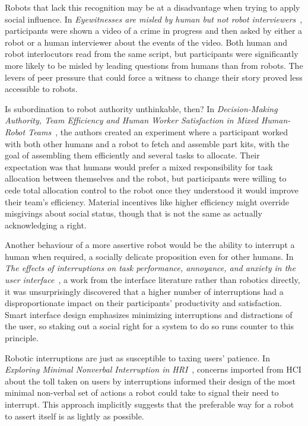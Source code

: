 \documentclass{sfuthesis}
\begin{document}
Robots that lack this recognition may be at a disadvantage when trying to apply social influence. In \textit{Eyewitnesses are misled by human but not robot interviewers}~\cite{bethel2013eyewitnesses}, participants were shown a video of a crime in progress and then asked by either a robot or a human interviewer about the events of the video. Both human and robot interlocutors read from the same script, but participants were significantly more likely to be misled by leading questions from humans than from robots. The levers of peer pressure that could force a witness to change their story proved less accessible to robots. 

Is subordination to robot authority unthinkable, then? In \textit{Decision-Making Authority, Team Efficiency and Human Worker Satisfaction in Mixed Human-Robot Teams}~\cite{gombolay2015decision}, the authors created an experiment where a participant worked with both other humans and a robot to fetch and assemble part kits, with the goal of assembling them efficiently and several tasks to allocate. Their expectation was that humans would prefer a mixed responsibility for task allocation between themselves and the robot, but participants were willing to cede total allocation control to the robot once they understood it would improve their team's efficiency. Material incentives like higher efficiency might override misgivings about social status, though that is not the same as actually acknowledging a right.


Another behaviour of a more assertive robot would be the ability to interrupt a human when required, a socially delicate proposition even for other humans. In \textit{The effects of interruptions on task performance, annoyance, and anxiety in the user interface}~\cite{bailey2001effects}, a work from the interface literature rather than robotics directly, it was unsurprisingly discovered that a higher number of interruptions had a disproportionate impact on their participants' productivity and satisfaction. Smart interface design emphasizes minimizing interruptions and distractions of the user, so staking out a social right for a system to do so runs counter to this principle.

Robotic interruptions are just as susceptible to taxing users' patience. In \textit{Exploring Minimal Nonverbal Interruption in HRI}~\cite{saulnier2011exploring}, concerns imported from HCI about the toll taken on users by interruptions informed their design of the most minimal non-verbal set of actions a robot could take to signal their need to interrupt. This approach implicitly suggests that the preferable way for a robot to assert itself is as lightly as possible.
\end{document}

